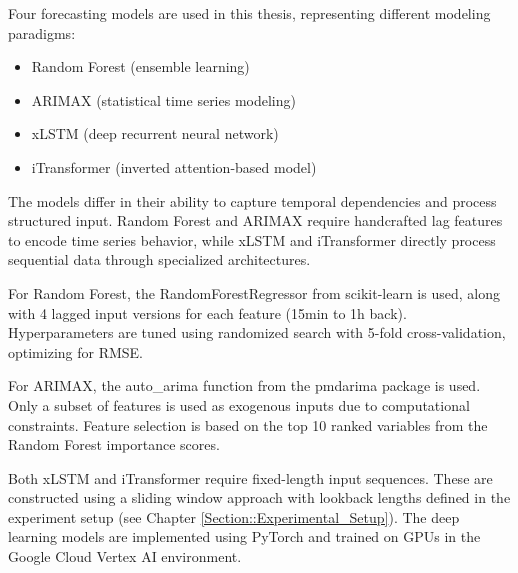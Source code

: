 \documentclass[class=scrbook, crop=false]{standalone}
\begin{document}
Four forecasting models are used in this thesis, representing different modeling paradigms:
\begin{itemize}
\item Random Forest (ensemble learning)
\item ARIMAX (statistical time series modeling)
\item xLSTM (deep recurrent neural network)
\item iTransformer (inverted attention-based model)
\end{itemize}

The models differ in their ability to capture temporal dependencies and process structured input. Random Forest and ARIMAX require handcrafted lag features to encode time series behavior, while xLSTM and iTransformer directly process sequential data through specialized architectures.

For Random Forest, the RandomForestRegressor from scikit-learn is used, along with 4 lagged input versions for each feature (15min to 1h back). Hyperparameters are tuned using randomized search with 5-fold cross-validation, optimizing for RMSE.

For ARIMAX, the auto\_arima function from the pmdarima package is used. Only a subset of features is used as exogenous inputs due to computational constraints. Feature selection is based on the top 10 ranked variables from the Random Forest importance scores.

Both xLSTM and iTransformer require fixed-length input sequences. These are constructed using a sliding window approach with lookback lengths defined in the experiment setup (see Chapter \ref{Section::Experimental_Setup}). The deep learning models are implemented using PyTorch and trained on GPUs in the Google Cloud Vertex AI environment.


%

\end{document}
